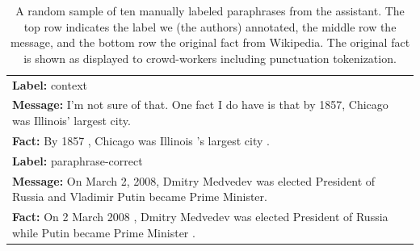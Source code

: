 \begin{table}
\begin{tabular}{p{15cm}}
        \midrule
        \textbf{Label:} context                                                                                                                                                                                                                                                                                                                                                                                      \\
        \textbf{Message:} I'm not sure of that. One fact I do have is that by 1857, Chicago was Illinois' largest city.                                                                                                                                                                                                                                                                                              \\
        \textbf{Fact:} By 1857 , Chicago was Illinois 's largest city .                                                                                                                                                                                                                                                                                                                                              \\
        \midrule
        \textbf{Label:} paraphrase-correct                                                                                                                                                                                                                                                                                                                                                                           \\
        \textbf{Message:} On March 2, 2008, Dmitry Medvedev was elected President of Russia and Vladimir Putin became Prime Minister.                                                                                                                                                                                                                                                                                \\
        \textbf{Fact:} On 2 March 2008 , Dmitry Medvedev was elected President of Russia while Putin became Prime Minister .                                                                                                                                                                                                                                                                                         \\
        \bottomrule
    \end{tabular}
    \caption{
        A random sample of ten manually labeled paraphrases from the assistant.
        The top row indicates the label we (the authors) annotated, the middle row the message, and the bottom row the original fact from Wikipedia.
        The original fact is shown as displayed to crowd-workers including punctuation tokenization.
    }
    \label{tab:par-ex}
\end{table}

